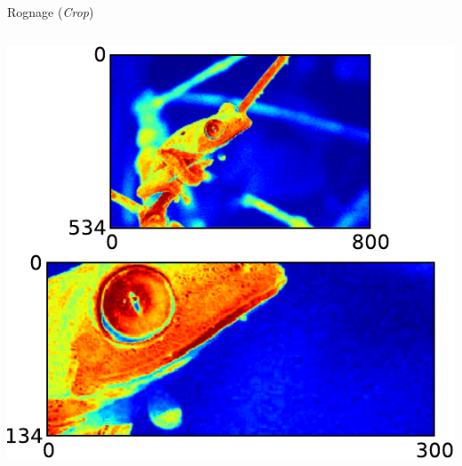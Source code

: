 \documentclass[8pt,a4paper]{beamer}
\begin{document}
\begin{frame}[containsverbatim]{Rognage (\textit{Crop})}
  \begin{columns}
  \includegraphics[width=\textwidth]{figures/grenouille_crop.pdf} 
  
    \end{columns}
\end{frame}
\end{document}
